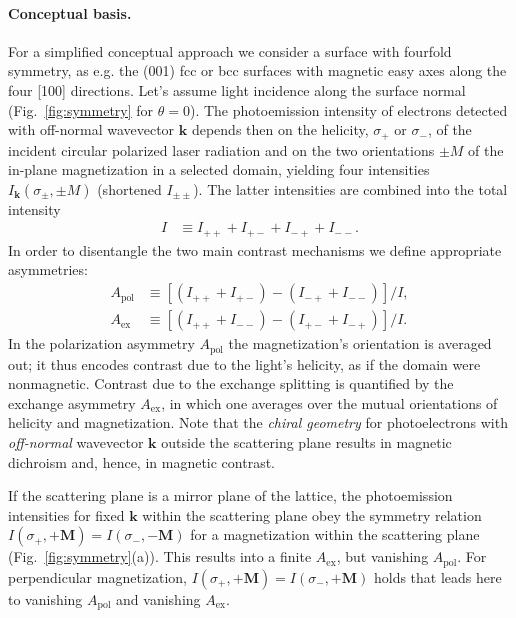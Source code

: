 \documentclass[prl,twocolumn,floatfix]{revtex4-2}
\renewcommand{\vec}[1]{\boldsymbol{#1}}
\begin{document}
\paragraph{Conceptual basis.} For a simplified conceptual approach we consider a surface with fourfold symmetry, as e.g. the (001) fcc or bcc surfaces with magnetic easy axes along the four [100] directions. Let's assume light incidence along the surface normal (Fig.~\ref{fig:symmetry} for $\theta=0$). The photoemission intensity of electrons detected with off-normal wavevector $\vec{k}$ depends then on the helicity, $\sigma_{+}$ or $\sigma_{-}$, of the incident circular polarized laser radiation and on the two orientations $\pm M$ of the in-plane magnetization in a selected domain, yielding four intensities $I_{\vec{k}}(\sigma_{\pm}, \pm M)$ (shortened $I_{\pm \pm}$). The latter intensities are combined into the total intensity
\begin{align}
    I & \equiv I_{+ +} + I_{+ -} + I_{- +} + I_{- -}. 
\end{align}
In order to disentangle the two main contrast mechanisms we define appropriate asymmetries:
\begin{subequations}
\begin{align}
    A_{\mathrm{pol}} & \equiv \left[ \left( I_{+ +} + I_{+ -} \right) - \left( I_{- +} + I_{- -} \right) \right] / I,
    \label{eq:Apol}
    \\
    A_{\mathrm{ex}} & \equiv \left[ \left( I_{+ +} + I_{- -} \right) - \left( I_{+ -} + I_{- +} \right) \right] / I.
    \label{eq:Aex}
\end{align}    
\end{subequations}
In the polarization asymmetry $A_{\mathrm{pol}}$ the magnetization's orientation is averaged out; it thus encodes contrast due to the light's helicity, as if the domain were nonmagnetic. Contrast due to the exchange splitting is quantified by the exchange asymmetry $A_{\mathrm{ex}}$, in which one averages over the mutual orientations of helicity and magnetization. Note that the \textit{chiral geometry} for photoelectrons with \textit{off-normal} wavevector $\vec{k}$ outside the scattering plane results in magnetic dichroism and, hence, in magnetic contrast.


If the scattering plane is a mirror plane of the lattice, the photoemission intensities for fixed $\vec{k}$ within the scattering plane obey the symmetry relation $I(\sigma_{+}, +\vec{M}) = I(\sigma_{-}, -\vec{M})$ for a magnetization within the scattering plane (Fig.~\ref{fig:symmetry}(a)). This results into a finite $A_{\mathrm{ex}}$, but vanishing $A_{\mathrm{pol}}$. For perpendicular magnetization, $I(\sigma_{+}, +\vec{M}) = I(\sigma_{-}, +\vec{M})$ holds that leads here to vanishing $A_{\mathrm{pol}}$ and vanishing $A_{\mathrm{ex}}$.
\end{document}
